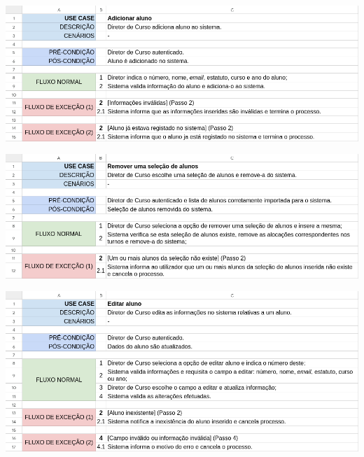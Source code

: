 \documentclass[a4paper,12pt]{scrreprt}
\begin{document}
\begin{minipage}{\textwidth}
    \centering
    \includegraphics[width=1\textwidth]{images/use-cases/descriptions/08-Adicionar aluno.png}
    \label{fig:3-08-adicionar_aluno}
\end{minipage}

\begin{minipage}{\textwidth}
    \centering
    \includegraphics[width=1\textwidth]{images/use-cases/descriptions/09-Remover uma seleção de alunos.png}
    \label{fig:3-09-remover_uma_selecao_de_alunos}
\end{minipage}

\begin{minipage}{\textwidth}
    \centering
    \includegraphics[width=1\textwidth]{images/use-cases/descriptions/10-Editar aluno.png}
    \label{fig:3-10-editar_aluno}
\end{minipage}
\end{document}
